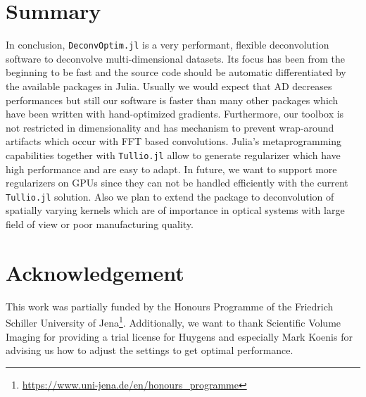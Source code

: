 \documentclass{juliacon}
\begin{document}
\section{Summary}
    In conclusion, \verb|DeconvOptim.jl| is a very performant, flexible deconvolution software to deconvolve multi-dimensional datasets.
    Its focus has been from the beginning to be fast and the source code should be automatic differentiated by the available
    packages in Julia. Usually we would expect that AD decreases performances but still our software is faster than
    many other packages which have been written with hand-optimized gradients.
    Furthermore, our toolbox is not restricted in dimensionality and has mechanism to prevent wrap-around artifacts which
    occur with FFT based convolutions.
    Julia's metaprogramming capabilities together with \verb|Tullio.jl| allow to generate regularizer which have high performance
    and are easy to adapt.
    In future, we want to support more regularizers on GPUs since they can not be handled efficiently with the current \verb|Tullio.jl| solution.
    Also we plan to extend the package to deconvolution of spatially varying kernels which are of importance in optical systems
    with large field of view or poor manufacturing quality.

\section{Acknowledgement}
This work was partially funded by the Honours Programme of the Friedrich Schiller 
University of Jena\footnote{\url{https://www.uni-jena.de/en/honours_programme}}. 
Additionally, we want to thank Scientific Volume Imaging for providing a trial license for Huygens and especially Mark Koenis for advising
us how to adjust the settings to get optimal performance. 


\end{document}
